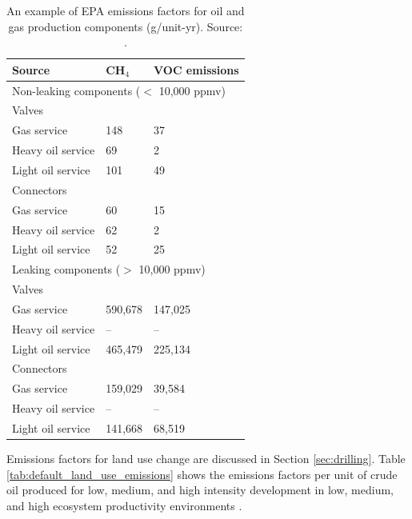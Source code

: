 \documentclass[11pt]{report}
\begin{document}
{{{{\begin{table}
\begin{scriptsize}
\caption{An example of EPA emissions factors for oil and gas production components (g/unit-yr). Source: \cite{API1996b}.}
\label{tab:EPA_EF_components}
\begin{tabular*}{0.7\columnwidth}{p{}p{}p{}}
\toprule
Source & CH$_{4}$ & VOC emissions \\
\midrule
\multicolumn{3}{p{0.66\columnwidth}}{Non-leaking components ($<$ 10,000 ppmv)} \\
\midrule

Valves & & \\
\quad\quad Gas service & 148 & 37 \\
\quad\quad Heavy oil service & 69 & 2 \\
\quad\quad Light oil service & 101 & 49 \\

Connectors & & \\
\quad\quad Gas service & 60 & 15 \\
\quad\quad Heavy oil service & 62 & 2 \\
\quad\quad Light oil service & 52 & 25 \\

\midrule
\multicolumn{3}{p{0.66\columnwidth}}{Leaking components ($>$ 10,000 ppmv)} \\
\midrule
Valves & & \\
\quad\quad Gas service & 590,678 & 147,025 \\
\quad\quad Heavy oil service & -- & -- \\
\quad\quad Light oil service & 465,479 & 225,134 \\

Connectors & & \\
\quad\quad Gas service & 159,029 & 39,584 \\
\quad\quad Heavy oil service & -- & -- \\
\quad\quad Light oil service & 141,668 & 68,519 \\

\bottomrule
\end{tabular*}
\end{scriptsize}
\end{table}


Emissions factors for land use change are discussed in Section \ref{sec:drilling}. Table \ref{tab:default_land_use_emissions} shows the emissions factors per unit of crude oil produced for low, medium, and high intensity development in low, medium, and high ecosystem productivity environments \cite{Yeh2010}.








}}}}
\end{document}
